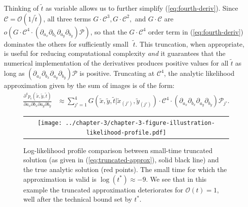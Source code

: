Thinking of $\tilde{t}$ as variable allows us to further simplify
(\ref{eq:fourth-deriv}). Since
$\mathcal{C} = \mathcal{O}(1/\tilde{t})$, all three terms
$G\cdot \mathcal{C}^3, G\cdot \mathcal{C}^2,$ and $G\cdot \mathcal{C}$
are
$o\left( G\cdot \mathcal{C}^4 \cdot \left(\partial_{a_x}\partial_{b_x}
    \partial_{a_y}\partial_{b_y} \right)\mathcal{P} \right)$, so that
the $G\cdot \mathcal{C}^4$ order term in (\ref{eq:fourth-deriv})
dominates the others for sufficiently small $\,\,\tilde{t}$. This
truncation, when appropriate, is useful for reducing computational
complexity \textit{and} it guarantees that the numerical
implementation of the derivatives produces positive values for all
$\tilde{t}$ as long as
$\left(\partial_{a_x}\partial_{b_x} \partial_{a_y}\partial_{b_y}
\right)\mathcal{P}$ is positive. Truncating at $\mathcal{C}^4$, the
analytic likelihood approximation given by the sum of images is of the
form:
\begin{align}
  \frac{\partial^4 p_\epsilon(\tilde{x}, \tilde{y}, \tilde{t})}{\partial a_x
  \partial b_x \partial a_y \partial b_y} &\approx \sum_{j'=1}^{4} G(\tilde{x},\tilde{y},\tilde{t}|\tilde{x}_{(j')},\tilde{y}_{(j')}) \cdot \mathcal{C}^4 \cdot \left(\partial_{a_x}\partial_{b_x} \partial_{a_y}\partial_{b_y} \right)\mathcal{P}_{j'}. \label{eq:truncated-approx}
\end{align}
\begin{figure}
  \begin{tabular}{c}
    \begin{minipage}{0.90\textwidth}
      \centering
      \texttt{[image: ../chapter-3/chapter-3-figure-illustration-likelihood-profile.pdf]}
      \caption{Log-likelihood profile comparison between small-time
        truncated solution (as given in (\ref{eq:truncated-approx}),
        solid black line) and the true analytic solution (red
        points). The small time for which the approximation is valid
        is $\log(t^*) \approx -9$. We see that in this example the
        truncated approximation deteriorates for $\mathcal{O}(t) = 1$,
        well after the technical bound set by $t^*$.}
      \label{fig:illustration-likelihood-profile}
    \end{minipage}
  \end{tabular}
\end{figure}
